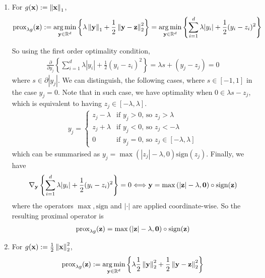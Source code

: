 \documentclass{article}
\begin{document}
\begin{enumerate}[label=1.I.\arabic*]
    \item For $g(\mathbf{x}):=\left\lVert\mathbf{x}\right\rVert_1$,
    \begin{align}
        \text{prox}_{\lambda g}(\mathbf{z}) := \operatorname*{arg\,min}_{\mathbf{y} \in \mathbb{R}^d} \left\lbrace \lambda \left\lVert\mathbf{y}\right\rVert_1 + \frac{1}{2} \left\lVert\mathbf{y} - \mathbf{z}\right\rVert^2_2\right\rbrace = \operatorname*{arg\,min}_{\mathbf{y} \in \mathbb{R}^d} \left\lbrace \sum_{i=1}^d \lambda |y_i| + \frac{1}{2} (y_i-z_i)^2\right\rbrace
    \end{align}
    
    So using the first order optimality condition,
    \begin{align}
       \frac{\partial}{\partial y_j} \left\lbrace \sum_{i=1}^d \lambda |y_i| + \frac{1}{2} (y_i-z_i)^2 \right\rbrace =  \lambda s + (y_j-z_j) = 0
    \end{align}
    where $s \in \partial |y_j |$. We can distinguish, the following cases, where $s\in [-1,1]$ in the case $y_j=0$. Note that in such case, we have optimality when $0\in \lambda s- z_j$, which is equivalent to having $z_j \in [-\lambda, \lambda]$.
    \begin{align}
        y_j =
        \begin{cases}
            z_j - \lambda &\text{if $y_j>0$, so $z_j > \lambda$} \\
            z_j + \lambda &\text{if $y_j<0$, so $z_j < -\lambda$} \\
            0 &\text{if $y_j=0$, so $z_j\in[-\lambda, \lambda]$}
        \end{cases}
    \end{align}
    which can be summarised as $y_j = \max{(|z_j|-\lambda, 0)}\text{sign}(z_j)$. Finally, we have
    \begin{align}
         \nabla_{\mathbf{y}} \left\lbrace \sum_{i=1}^d \lambda |y_i| + \frac{1}{2} (y_i-z_i)^2 \right\rbrace = 0 \Longleftrightarrow \mathbf{y} = \max{(|\mathbf{z}|-\lambda, \mathbf{0})}\circ \text{sign}(\mathbf{z})
    \end{align}
    where the operators $\max, \text{sign}$ and $|\cdot|$ are applied coordinate-wise. So the resulting proximal operator is
    \begin{align}
        \text{prox}_{\lambda g}(\mathbf{z}) = \max{(|\mathbf{z}|-\lambda, \mathbf{0})}\circ 
        \text{sign}(\mathbf{z})
    \end{align}
    
    \item For $g(\mathbf{x}):=\frac{1}{2}\left\lVert\mathbf{x}\right\rVert_2^2$,
    \begin{align}
        \text{prox}_{\lambda g}(\mathbf{z}) := \operatorname*{arg\,min}_{\mathbf{y} \in \mathbb{R}^d} \left\lbrace \lambda \frac{1}{2}\left\lVert\mathbf{y}\right\rVert_2^2 + \frac{1}{2} \left\lVert\mathbf{y} - \mathbf{z}\right\rVert^2_2\right\rbrace
    \end{align}
    

\end{enumerate}
\end{document}

